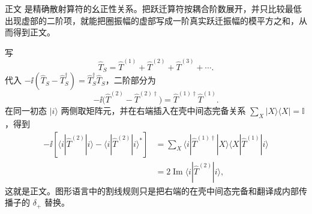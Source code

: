 \begin{derivation}

正文 是精确散射算符的幺正性关系。把跃迁算符按耦合阶数展开，并只比较最低出现虚部的二阶项，就能把圈振幅的虚部写成一阶真实跃迁振幅的模平方之和，从而得到正文。

写
\begin{equation*}
 \hat T_S=\hat T^{(1)}+\hat T^{(2)}+\hat T^{(3)}+\cdots .
\end{equation*}
代入
$-\ii(\hat T_S-\hat T_S^\dagger)=\hat T_S^\dagger\hat T_S$，二阶部分为
\begin{equation*}
 -\ii\bigl(\hat T^{(2)}-\hat T^{(2)\dagger}\bigr)
 =\hat T^{(1)\dagger}\hat T^{(1)}.
\end{equation*}
在同一初态 $|i\rangle$ 两侧取矩阵元，并在右端插入在壳中间态完备关系 $\sum_X|X\rangle\langle X|=\mathbb I$，得到
\begin{align*}
 -\ii\left[
 \langle i|\hat T^{(2)}|i\rangle
 -\langle i|\hat T^{(2)}|i\rangle^*
 \right]
 &=\sum_X
 \langle i|\hat T^{(1)\dagger}|X\rangle
 \langle X|\hat T^{(1)}|i\rangle\\
 &=2\operatorname{Im}\langle i|\hat T^{(2)}|i\rangle,
\end{align*}
这就是正文。图形语言中的割线规则只是把右端的在壳中间态完备和翻译成内部传播子的 $\delta_+$ 替换。
\end{derivation}
